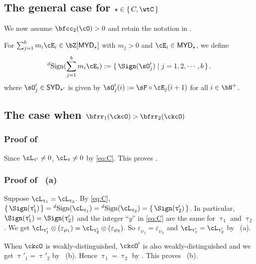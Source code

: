 \documentclass[12pt,a4paper]{amsart}
\def\SYD{{\mathsf{SYD}}}
\def\MYD{{\mathsf{MYD}}}
\def\ac{\cL}
\numberwithin{equation}{section}
\theoremstyle{remark}
\def\dsign{{}^d\mathrm{Sign}}
\begin{document}




\subsection{The general case for $\star\in \set{C,\wtC}$}
We now assume $\bfcc_{2}(\cO)>0$ and retain the notation in .

For $\sum_{j=1}^{b} m_{i} \cE_{i}\in \bZ[\MYD_{\star}]$ with $m_{j}>0$ and
$\cE_{i}\in \MYD_{\star}$, we define
\[
  \dsign(\sum_{j=1}^{b} m_{i} \cE_{i}) := \set{\Sign(\sO'_{j})|j=1,2,\cdots, b}.
\] where  $\sO'_{j} \in \SYD_{\star'}$ is given by $\sO'_{j}(i) := \sF\circ \cE_{j}(i+1)$ for all
$i\in \bN^{+}$.

\medskip

\subsection*{The case when $\bfrr_{1}(\ckcO)>\bfrr_{2}(\ckcO)$}

\subsubsection*{Proof of }
Since $\ac_{\uptau'}\neq 0$, $\ac_{\uptau}\neq 0$ by \eqref{eq:C}. This proves .


\smallskip

\subsubsection*{Proof of ~(a)}
Suppose $\ac_{\uptau_{1}}=\ac_{\uptau_{2}}$. By \eqref{eq:C},
$\set{\Sign(\uptau'_{1})}=\dsign(\ac_{\uptau_{1}}) =\dsign(\ac_{\uptau_{2}}) = \set{\Sign(\uptau'_{2})}$.
In particular, $\Sign(\uptau'_{1})=\Sign(\uptau'_{2})$ and the integer ``$y$'' in \eqref{eq:C} are the same for $\uptau_{1}$
and $\uptau_{2}$. We get
$\ac_{\uptau'_{1}}\otimes (\varepsilon_{\wp_{1}})=\ac_{\uptau'_{2}}\otimes (\varepsilon_{\wp_{2}})$.
So $\varepsilon_{\wp_{1}}=\varepsilon_{\wp_{2}}$ and $\ac_{\uptau'_{1}}=\ac_{\uptau'_{2}}$ by ~(a).


\smallskip

When $\ckcO$ is weakly-distinguished, $\ckcO'$ is also weakly-distinguished and  we get $\uptau'_{1}=\uptau'_{2}$ by
~(b). Hence $\uptau_{1}=\uptau_{2}$ by . This
proves ~(b).
\end{document}
